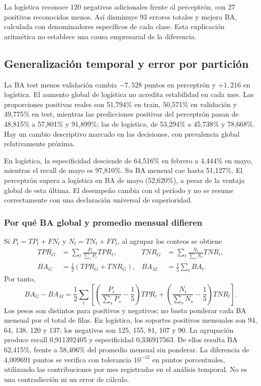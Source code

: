La logística reconoce 120 negativos adicionales frente al perceptrón, con 27 positivos reconocidos menos. Así disminuye 93 errores totales y mejora BA, calculada con denominadores específicos de cada clase. Esta explicación aritmética no establece una causa empresarial de la diferencia.

\subsection{Generalización temporal y error por partición}
La BA test menos validación cambia $-7,528$ puntos en perceptrón y $+1,216$ en logística. El aumento global de logística no acredita estabilidad en cada mes. Las proporciones positivas reales son 51,794\% en train, 50,571\% en validación y 49,775\% en test, mientras las predicciones positivas del perceptrón pasan de 48,815\% a 57,801\% y 91,899\%; las de logística, de 53,294\% a 45,738\% y 78,668\%. Hay un cambio descriptivo marcado en las decisiones, con prevalencia global relativamente próxima.

En logística, la especificidad desciende de 64,516\% en febrero a 4,444\% en mayo, mientras el recall de mayo es 97,810\%. Su BA mensual cae hasta 51,127\%. El perceptrón supera a logística en BA de mayo (52,620\%), a pesar de la ventaja global de esta última. El desempeño cambia con el período y no se resume correctamente con una declaración universal de superioridad.

\subsubsection{Por qué BA global y promedio mensual difieren}
Si $P_t=TP_t+FN_t$ y $N_t=TN_t+FP_t$, al agrupar los conteos se obtiene
\begin{align}
TPR_G&=\sum_t\frac{P_t}{\sum_sP_s}TPR_t,&TNR_G&=\sum_t\frac{N_t}{\sum_sN_s}TNR_t,\\
BA_G&=\tfrac12(TPR_G+TNR_G),&BA_M&=\frac15\sum_t BA_t.
\end{align}
Por tanto,
\begin{equation}BA_G-BA_M=\frac12\sum_t\left[\left(\frac{P_t}{\sum_sP_s}-\frac15\right)TPR_t+\left(\frac{N_t}{\sum_sN_s}-\frac15\right)TNR_t\right].\end{equation}
Los pesos son distintos para positivos y negativos; no basta ponderar cada BA mensual por el total de filas. En logística, los soportes positivos mensuales son 94, 64, 138, 120 y 137; los negativos son 125, 155, 81, 107 y 90. La agrupación produce recall 0,911392405 y especificidad 0,336917563. De ellos resulta BA 62,415\%, frente a 58,406\% del promedio mensual sin ponderar. La diferencia de 4,009691 puntos se verifica con tolerancia $10^{-12}$ en puntos porcentuales, utilizando las contribuciones por mes registradas en el análisis temporal. No es una contradicción ni un error de cálculo.

